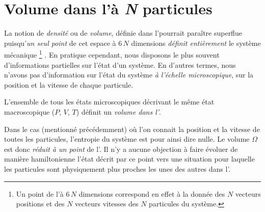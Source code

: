 \section{Volume dans l'\edp à \textit{N} particules}%

La notion de \emph{densité} ou de \emph{volume}, définie dans l'\edpNp pourrait paraître superflue puisqu'\emph{un seul point} de cet espace à $6\,N$ dimensions \emph{définit entièrement} le système mécanique%
\footnote{Un point de l'\edp à $6\,N$ dimensions correspond en effet à la donnée des $N$ vecteurs positions et des $N$ vecteurs vitesses des $N$ particules du système.}%
.
En pratique cependant, nous disposons le plus souvent d'informations partielles sur l'état d'un système. En d'autres termes, nous n'avons pas d'information sur l'état du système \emph{à l'échelle microscopique}, \cad sur la position et la vitesse de chaque particule.

L'ensemble de tous les états microscopiques décrivant le même état macroscopique ($P$, $V$, $T$) définit un \emph{volume dans l'\edpNp}.


Dans le cas (mentionné précédemment) %
où l'on connait la position et la vitesse de toutes les particules, l'entropie du système est pour ainsi dire nulle. Le volume $\Omega$ est donc \emph{réduit à un point} de l'\edpNp. Il n'y a aucune objection à faire évoluer de manière hamiltonienne l'état décrit par ce point vers une situation pour laquelle les particules sont physiquement plus proches les unes des autres dans l'\edpup.

\casse

